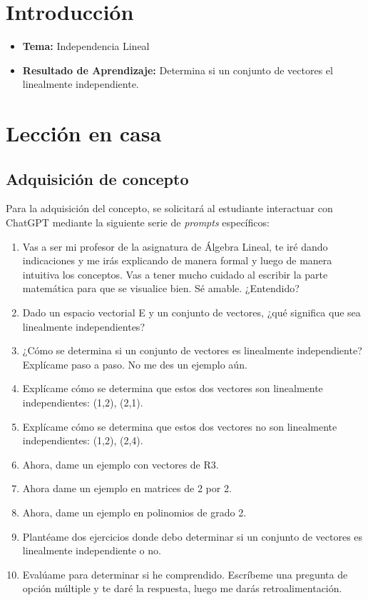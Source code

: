 \documentclass[a4,11pt]{aleph-notas}
\begin{document}
\encabezado


\section*{Introducción}

\begin{itemize}
    \item \textbf{Tema:} Independencia Lineal
    \item \textbf{Resultado de Aprendizaje:} Determina si un conjunto de vectores el linealmente independiente.
\end{itemize}

\section{Lección en casa}

\subsection{Adquisición de concepto}

Para la adquisición del concepto, se solicitará al estudiante interactuar con ChatGPT mediante la siguiente serie de \textit{prompts} específicos:

\begin{enumerate}[label=\textit{Prompt \arabic*.},leftmargin=2.1cm]
    \item Vas a ser mi profesor de la asignatura de Álgebra Lineal, te iré dando indicaciones y me irás explicando de manera formal y luego de manera intuitiva los conceptos. Vas a tener mucho cuidado al escribir la parte matemática para que se visualice bien. Sé amable. ¿Entendido?
    \item Dado un espacio vectorial E y un conjunto de vectores, ¿qué significa que sea linealmente independientes?
    \item ¿Cómo se determina si un conjunto de vectores es linealmente independiente? Explícame paso a paso. No me des un ejemplo aún.
    \item Explícame cómo se determina que estos dos vectores son linealmente independientes: (1,2), (2,1). 
    \item Explícame cómo se determina que estos dos vectores no son linealmente independientes: (1,2), (2,4). 
    \item Ahora, dame un ejemplo con vectores de R3.
    \item Ahora dame un ejemplo en matrices de 2 por 2.
    \item Ahora, dame un ejemplo en polinomios de grado 2.
    \item Plantéame dos ejercicios donde debo determinar si un conjunto de vectores es linealmente independiente o no.
    \item Evalúame para determinar si he comprendido. Escríbeme una pregunta de opción múltiple y te daré la respuesta, luego me darás retroalimentación.
\end{enumerate}
\end{document}
